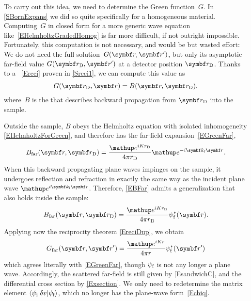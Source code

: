 To carry out this idea, we need to determine the Green function~$G$.
%
In \cref{SBornExpans} we did so quite specifically
for a homogeneous material.
Computing~$G$ in closed form for a more generic wave equation
like~\cref{EHelmholtzGradedHomog} is far more difficult,
if not outright impossible.
Fortunately, this computation is not necessary,
and would be but wasted effort:
We do not need the full solution~$G(\r,\r')$,
but only its asymptotic far-field value $G(\rD,\r')$
at a detector position $\rD$.
%
Thanks to a ~\cref{Ereci}
%
proven in \cref{Sreci1},
we can compute this value
as
\begin{equation}\label{EreciDup}
  G(\rD,\r) = B(\r,\rD),
\end{equation}
%
where~$B$ is the 
that describes backward propagation from $\rD$ into the sample.

Outside the sample,
$B$ obeys the Helmholtz equation
with isolated inhomogeneity \cref{EHelmholtzForGreen},
and therefore has the far-field expansion~\cref{EGreenFar},
%
\begin{equation}\label{EBFar}
  B_\text{far}(\r,\rD)
  =\frac{\e^{iKr_\text{D}}}{4\pi r_\text{D}}\e^{-i\k_\tf \r}.
\end{equation}
When this backward propagating plane waves impinges on the sample,
it undergoes reflection and refraction in exactly the same way as
the incident plane wave $\e^{i\k_\ti\r}$.
Therefore,
 \cref{EBFar} admits a generalization that also holds inside the sample:
\begin{equation}\label{EBFull}
  B_\text{far}(\r,\rD)
  = \frac{\e^{iKr_\text{D}}}{4\pi r_\text{D}}\psi^*_\tf(\r).
\end{equation}
Applying now the reciprocity theorem \cref{EreciDup},
we obtain
\begin{equation}\label{EGreenFarDWBA}
  G_\text{far}(\r,\r')
  = \frac{\e^{iKr}}{4\pi r}\psi^*_\tf(\r')
\end{equation}
which agrees literally with \cref{EGreenFar},
though $\psi_{\text{f}}$ is not any longer a plane wave.
Accordingly,
the scattered far-field is still given by \cref{EsandwichC},
and the differential cross section by \cref{Exsection}.
We only need to redetermine the matrix element
$\left\langle \psi_{\text{i}}|\delta v|\psi_{\text{f}}\right\rangle$,
which no longer has the plane-wave form~\cref{Echiq}.

